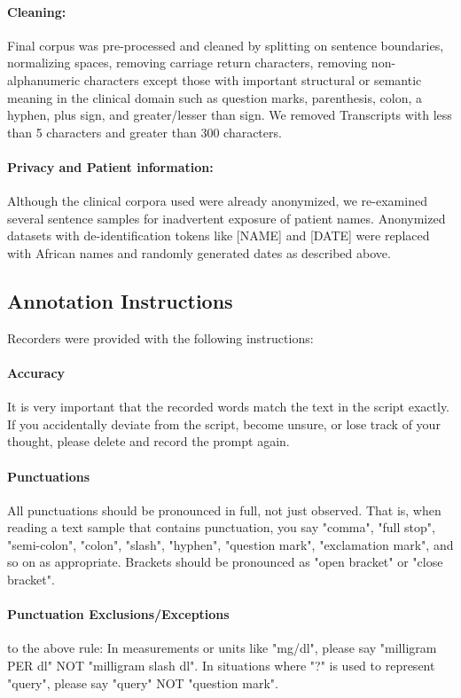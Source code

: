 \documentclass[11pt,a4paper]{article}
\begin{document}
  \paragraph{Cleaning:}  Final corpus was pre-processed and cleaned by splitting on sentence boundaries, normalizing spaces, removing carriage return characters, removing non-alphanumeric characters except those with important structural or semantic meaning in the clinical domain such as question marks, parenthesis, colon, a hyphen, plus sign, and greater/lesser than sign. We removed Transcripts with less than 5 characters and greater than 300 characters.
  \paragraph{Privacy and Patient information:} Although the clinical corpora used were already anonymized, we re-examined several sentence samples for inadvertent exposure of patient names. Anonymized datasets with de-identification tokens like [NAME] and [DATE] were replaced with African names and randomly generated dates as described above.

\subsection{Annotation Instructions}\label{appendix:annotation}
Recorders were provided with the following instructions:

    \paragraph{Accuracy} It is very important that the recorded words match the text in the script exactly. If you accidentally deviate from the script, become unsure, or lose track of your thought, please delete and record the prompt again.
    \paragraph{Punctuations} All punctuations should be pronounced in full, not just observed. That is, when reading a text sample that contains punctuation, you say "comma", "full stop", "semi-colon", "colon", "slash", "hyphen", "question mark", "exclamation mark", and so on as appropriate. Brackets should be pronounced as "open bracket" or "close bracket".
    \paragraph{Punctuation Exclusions/Exceptions}  to the above rule: In measurements or units like "mg/dl", please say "milligram PER dl" NOT "milligram slash dl". In situations where "?" is used to represent "query", please say "query" NOT "question mark".
\end{document}

